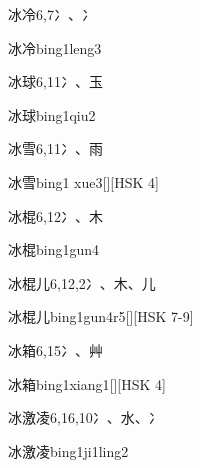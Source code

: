 \begin{Entry}{冰冷}{6,7}{⼎、⼎}
  \begin{Phonetics}{冰冷}{bing1leng3}
  \end{Phonetics}
\end{Entry}

\begin{Entry}{冰球}{6,11}{⼎、⽟}
  \begin{Phonetics}{冰球}{bing1qiu2}
  \end{Phonetics}
\end{Entry}

\begin{Entry}{冰雪}{6,11}{⼎、⾬}
  \begin{Phonetics}{冰雪}{bing1 xue3}[][HSK 4]
  \end{Phonetics}
\end{Entry}

\begin{Entry}{冰棍}{6,12}{⼎、⽊}
  \begin{Phonetics}{冰棍}{bing1gun4}
  \end{Phonetics}
\end{Entry}

\begin{Entry}{冰棍儿}{6,12,2}{⼎、⽊、⼉}
  \begin{Phonetics}{冰棍儿}{bing1gun4r5}[][HSK 7-9]
  \end{Phonetics}
\end{Entry}

\begin{Entry}{冰箱}{6,15}{⼎、⾋}
  \begin{Phonetics}{冰箱}{bing1xiang1}[][HSK 4]
  \end{Phonetics}
\end{Entry}

\begin{Entry}{冰激凌}{6,16,10}{⼎、⽔、⼎}
  \begin{Phonetics}{冰激凌}{bing1ji1ling2}
  \end{Phonetics}
\end{Entry}

